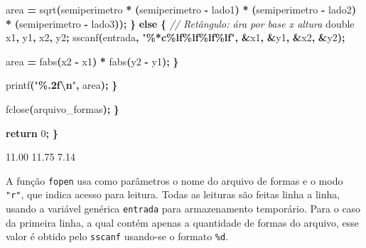 \documentclass[
  11pt,
  a4paper,
]{scrbook}
\newenvironment{Shaded}{\begin{snugshade}}{\end{snugshade}}
\newcommand{\CommentTok}[1]{\textcolor[rgb]{0.56,0.35,0.01}{\textit{#1}}}
\newcommand{\ControlFlowTok}[1]{\textcolor[rgb]{0.13,0.29,0.53}{\textbf{#1}}}
\newcommand{\DataTypeTok}[1]{\textcolor[rgb]{0.13,0.29,0.53}{#1}}
\newcommand{\DecValTok}[1]{\textcolor[rgb]{0.00,0.00,0.81}{#1}}
\newcommand{\NormalTok}[1]{#1}
\newcommand{\OperatorTok}[1]{\textcolor[rgb]{0.81,0.36,0.00}{\textbf{#1}}}
\newcommand{\SpecialCharTok}[1]{\textcolor[rgb]{0.81,0.36,0.00}{\textbf{#1}}}
\newcommand{\StringTok}[1]{\textcolor[rgb]{0.31,0.60,0.02}{#1}}
\begin{document}
\begin{Shaded}
\begin{Highlighting}[]
\NormalTok{                area }\OperatorTok{=}\NormalTok{ sqrt}\OperatorTok{(}\NormalTok{semiperimetro }\OperatorTok{*} \OperatorTok{(}\NormalTok{semiperimetro }\OperatorTok{{-}}\NormalTok{ lado1}\OperatorTok{)} \OperatorTok{*}
                            \OperatorTok{(}\NormalTok{semiperimetro }\OperatorTok{{-}}\NormalTok{ lado2}\OperatorTok{)} \OperatorTok{*} \OperatorTok{(}\NormalTok{semiperimetro }\OperatorTok{{-}}\NormalTok{ lado3}\OperatorTok{));}
            \OperatorTok{\}}
            \ControlFlowTok{else} \OperatorTok{\{}
                \CommentTok{// Retângulo: ára por base x altura}
                \DataTypeTok{double}\NormalTok{ x1}\OperatorTok{,}\NormalTok{ y1}\OperatorTok{,}\NormalTok{ x2}\OperatorTok{,}\NormalTok{ y2}\OperatorTok{;}
\NormalTok{                sscanf}\OperatorTok{(}\NormalTok{entrada}\OperatorTok{,} \StringTok{"}\SpecialCharTok{\%*c\%lf\%lf\%lf\%lf}\StringTok{"}\OperatorTok{,} \OperatorTok{\&}\NormalTok{x1}\OperatorTok{,} \OperatorTok{\&}\NormalTok{y1}\OperatorTok{,} \OperatorTok{\&}\NormalTok{x2}\OperatorTok{,} \OperatorTok{\&}\NormalTok{y2}\OperatorTok{);}

\NormalTok{                area }\OperatorTok{=}\NormalTok{ fabs}\OperatorTok{(}\NormalTok{x2 }\OperatorTok{{-}}\NormalTok{ x1}\OperatorTok{)} \OperatorTok{*}\NormalTok{ fabs}\OperatorTok{(}\NormalTok{y2 }\OperatorTok{{-}}\NormalTok{ y1}\OperatorTok{);}
            \OperatorTok{\}}

\NormalTok{            printf}\OperatorTok{(}\StringTok{"}\SpecialCharTok{\%.2f\textbackslash{}n}\StringTok{"}\OperatorTok{,}\NormalTok{ area}\OperatorTok{);}
        \OperatorTok{\}}

\NormalTok{        fclose}\OperatorTok{(}\NormalTok{arquivo\_formas}\OperatorTok{);}
    \OperatorTok{\}}

    \ControlFlowTok{return} \DecValTok{0}\OperatorTok{;}
\OperatorTok{\}}
\end{Highlighting}
\end{Shaded}

\begin{Shaded}
\begin{Highlighting}[]
\NormalTok{11.00}
\NormalTok{11.75}
\NormalTok{7.14}
\end{Highlighting}
\end{Shaded}

A função \texttt{fopen} usa como parâmetros o nome do arquivo de formas
e o modo \texttt{"r"}, que indica acesso para leitura. Todas as leituras
são feitas linha a linha, usando a variável genérica \texttt{entrada}
para armazenamento temporário. Para o caso da primeira linha, a qual
contém apenas a quantidade de formas do arquivo, esse valor é obtido
pelo \texttt{sscanf} usando-se o formato \texttt{\%d}.
\end{document}
